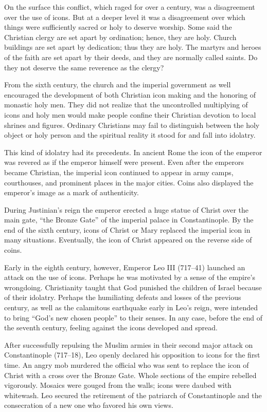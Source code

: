 On the surface this conflict, which raged for over a century, was a disagreement over the use of
icons. But at a deeper level it was a disagreement over which things were sufficiently sacred or
holy to deserve worship. Some said the Christian clergy are set apart by ordination; hence, they are
holy. Church buildings are set apart by dedication; thus they are holy. The martyrs and heroes of
the faith are set apart by their deeds, and they are normally called saints. Do they not deserve the
same reverence as the clergy?

From the sixth century, the church and the imperial government as well encouraged the development of
both Christian icon making and the honoring of monastic holy men. They did not realize that the
uncontrolled multiplying of icons and holy men would make people confine their Christian devotion to
local shrines and figures. Ordinary Christians may fail to distinguish between the holy object or
holy person and the spiritual reality it stood for and fall into idolatry.

This kind of idolatry had its precedents. In ancient Rome the icon of the emperor was revered as if
the emperor himself were present. Even after the emperors became Christian, the imperial icon
continued to appear in army camps, courthouses, and prominent places in the major cities. Coins also
displayed the emperor’s image as a mark of authenticity.

During Justinian’s reign the emperor erected a huge statue of Christ over the main gate, “the Bronze
Gate” of the imperial palace in Constantinople. By the end of the sixth century, icons of Christ or
Mary replaced the imperial icon in many situations. Eventually, the icon of Christ appeared on the
reverse side of coins.

Early in the eighth century, however, Emperor Leo III (717–41) launched an attack on the use of
icons. Perhaps he was motivated by a sense of the empire’s wrongdoing. Christianity taught that God
punished the children of Israel because of their idolatry. Perhaps the humiliating defeats and
losses of the previous century, as well as the calamitous earthquake early in Leo’s reign, were
intended to bring “God’s new chosen people” to their senses. In any case, before the end of the
seventh century, feeling against the icons developed and spread.

After successfully repulsing the Muslim armies in their second major attack on Constantinople
(717–18), Leo openly declared his opposition to icons for the first time. An angry mob murdered the
official who was sent to replace the icon of Christ with a cross over the Bronze Gate. Whole
sections of the empire rebelled vigorously. Mosaics were gouged from the walls; icons were daubed
with whitewash. Leo secured the retirement of the patriarch of Constantinople and the consecration
of a new one who favored his own views.


